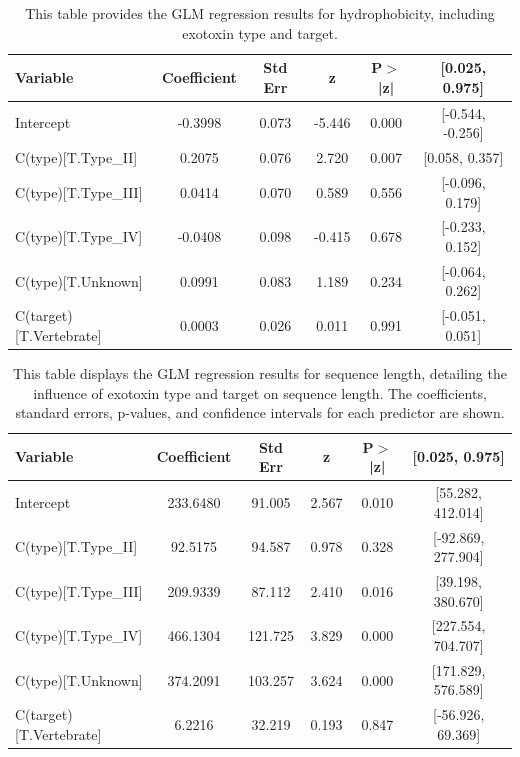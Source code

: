 \begin{table}[ht]
	\centering
	\caption{This table provides the GLM regression results for hydrophobicity, including exotoxin type and target.}
	\begin{tabular}{lccccc}
		\toprule
		Variable & Coefficient & Std Err & z & P$>$|z| & [0.025, 0.975] \\
		\midrule
		Intercept                   & -0.3998 & 0.073 & -5.446 & 0.000 & [-0.544, -0.256] \\
		C(type)[T.Type\_II]          & 0.2075 & 0.076 & 2.720  & 0.007 & [0.058, 0.357]  \\
		C(type)[T.Type\_III]         & 0.0414 & 0.070 & 0.589  & 0.556 & [-0.096, 0.179] \\
		C(type)[T.Type\_IV]          & -0.0408 & 0.098 & -0.415 & 0.678 & [-0.233, 0.152] \\
		C(type)[T.Unknown]          & 0.0991 & 0.083 & 1.189  & 0.234 & [-0.064, 0.262] \\
		C(target)[T.Vertebrate]     & 0.0003 & 0.026 & 0.011  & 0.991 & [-0.051, 0.051] \\
		\bottomrule
	\end{tabular}
	\label{tab:glm_hydrophobicity_appendix}
\end{table}

\begin{table}[ht]
	\centering
	\caption{This table displays the GLM regression results for sequence length, detailing the influence of exotoxin type and target on sequence length. The coefficients, standard errors, p-values, and confidence intervals for each predictor are shown.}
	\begin{tabular}{lccccc}
		\toprule
		Variable & Coefficient & Std Err & z & P$>$|z| & [0.025, 0.975] \\
		\midrule
		Intercept                   & 233.6480 & 91.005  & 2.567 & 0.010 & [55.282, 412.014] \\
		C(type)[T.Type\_II]          & 92.5175  & 94.587  & 0.978 & 0.328 & [-92.869, 277.904] \\
		C(type)[T.Type\_III]         & 209.9339 & 87.112  & 2.410 & 0.016 & [39.198, 380.670]  \\
		C(type)[T.Type\_IV]          & 466.1304 & 121.725 & 3.829 & 0.000 & [227.554, 704.707] \\
		C(type)[T.Unknown]          & 374.2091 & 103.257 & 3.624 & 0.000 & [171.829, 576.589] \\
		C(target)[T.Vertebrate]     & 6.2216   & 32.219  & 0.193 & 0.847 & [-56.926, 69.369] \\
		\bottomrule
	\end{tabular}
	\label{tab:glm_sequence_length_appendix}
\end{table}


